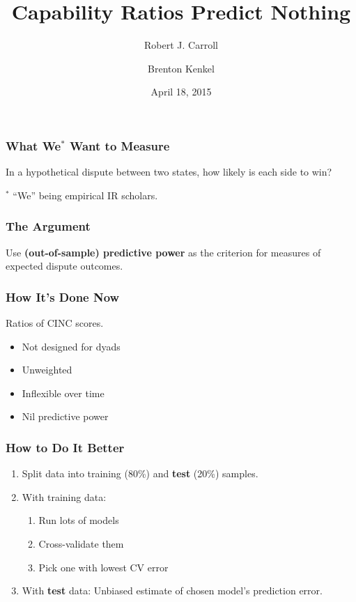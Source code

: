 \documentclass{beamer}
\title{Capability Ratios Predict Nothing}
\date{April 18, 2015}
\author{Robert J. Carroll \and Brenton Kenkel}
\begin{document}
\maketitle

\begin{frame}
  \frametitle{What We$^*$ Want to Measure}

  In a hypothetical dispute between two states, how likely is each side to win?

  \vspace{\fill}

  \begin{scriptsize}
    $^*$ ``We'' being empirical IR scholars.
  \end{scriptsize}
\end{frame}

\begin{frame}
  \frametitle{The Argument}

  Use \textbf{(out-of-sample) predictive power} as the criterion for measures of expected dispute outcomes.
\end{frame}

\begin{frame}
  \frametitle{How It's Done Now}

  Ratios of CINC scores.
  \begin{itemize}
    \item Not designed for dyads
    \item Unweighted
    \item Inflexible over time
    \item Nil predictive power
  \end{itemize}
\end{frame}

\begin{frame}
  \frametitle{How to Do It Better}

  \begin{enumerate}
    \item Split data into \alert{training} (80\%) and \textbf{test} (20\%) samples.

    \item With \alert{training} data:
    \begin{enumerate}
      \item Run lots of models
      \item Cross-validate them
      \item Pick one with lowest CV error
    \end{enumerate}

    \item With \textbf{test} data: Unbiased estimate of chosen model's prediction error.
  \end{enumerate}
\end{frame}
\end{document}
